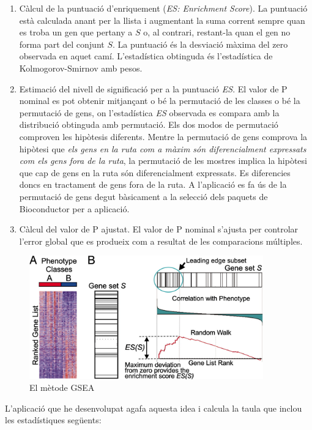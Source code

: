 \begin{enumerate}
\item Càlcul de la puntuació d'enriquement (\textit{ES: Enrichment Score}). La puntuació està calculada anant per la llista i augmentant la suma corrent sempre quan es troba un gen que pertany a $S$ o, al contrari, restant-la quan el gen no forma part del conjunt $S$. La puntuació és la desviació màxima del zero observada en aquet camí. L'estadística obtinguda és l’estadística de Kolmogorov-Smirnov amb pesos.

\item Estimació del nivell de significació per a la puntuació \textit{ES}. El valor de P nominal es pot obtenir mitjançant o bé la permutació de les classes o bé la permutació de gens, on l'estadística \textit{ES} observada es compara amb la distribució obtinguda amb permutació. Els dos modos de permutació comproven les hipòtesis diferents. Mentre la permutació de gens comprova la hipòtesi que \textit{els gens en la ruta com a màxim són diferencialment expressats com els gens fora de la ruta},
la permutació de les mostres implica la hipòtesi que cap de gens en la ruta són diferencialment expressats. Es diferencies doncs en tractament de gens fora de la ruta. A l'aplicació es fa ús de la permutació de gens degut bàsicament a la selecció dels paquets de Bioconductor per a aplicació.


\item Càlcul del valor de P ajustat. El valor de P nominal s'ajusta per controlar l'error global que es produeix com a resultat de les comparacions múltiples.
\end{enumerate}

\begin{figure}[H]
\centering
\includegraphics[width=0.9\textwidth]{figures/GSEA_Method.jpg} 
\caption{El mètode GSEA}
\end{figure}

L'aplicació que he desenvolupat agafa aquesta idea i calcula la taula que inclou les estadístiques següents:

